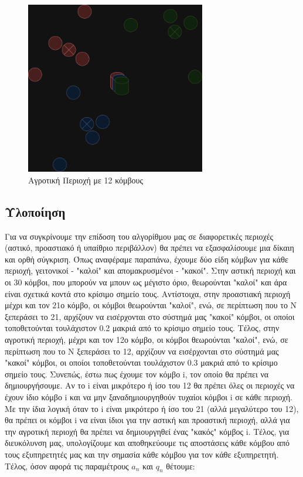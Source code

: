 \begin{figure}[H]
    \centering
    \includegraphics[width=0.7\textwidth]{figures/chapter1/rural.drawio.png}
    \caption{Αγροτική Περιοχή με 12 κόμβους}
    \label{fig49}
\end{figure}

\subsection{Υλοποίηση}

Για να συγκρίνουμε την επίδοση του αλγορίθμου μας σε διαφορετικές περιοχές (αστικό, προαστιακό ή υπαίθριο περιβάλλον) θα πρέπει να εξασφαλίσουμε μια δίκαιη και ορθή σύγκριση. Όπως αναφέραμε παραπάνω, έχουμε δύο είδη κόμβων για κάθε περιοχή, γειτονικοί - "καλοί" και απομακρυσμένοι - "κακοί". Στην αστική περιοχή και οι 30 κόμβοι, που μπορούν να μπουν ως μέγιστο όριο, θεωρούνται "καλοί" και άρα είναι σχετικά κοντά στο κρίσιμο σημείο τους. Αντίστοιχα, στην προαστιακή περιοχή μέχρι και τον 21ο κόμβο, οι κόμβοι θεωρούνται "καλοί", ενώ, σε περίπτωση που το Ν ξεπεράσει το 21, αρχίζουν να εισέρχονται στο σύστημά μας "κακοί" κόμβοι, οι οποίοι τοποθετούνται τουλάχιστον 0.2 μακριά από το κρίσιμο σημείο τους. Τέλος, στην αγροτική περιοχή, μέχρι και τον 12ο κόμβο, οι κόμβοι θεωρούνται "καλοί", ενώ, σε περίπτωση που το Ν ξεπεράσει το 12, αρχίζουν να εισέρχονται στο σύστημά μας "κακοί" κόμβοι, οι οποίοι τοποθετούνται τουλάχιστον 0.3 μακριά από το κρίσιμο σημείο τους. Συνεπώς, έστω πως έχουμε τον κόμβο i, τον οποίο θα πρέπει να δημιουργήσουμε. Αν το i είναι μικρότερο ή ίσο του 12 θα πρέπει όλες οι περιοχές να έχουν ίδιο κόμβο i και να μην ξαναδημιουργηθούν τυχαίοι κόμβοι i σε κάθε περιοχή. Με την ίδια λογική όταν το i είναι μικρότερο ή ίσο του 21 (αλλά μεγαλύτερο του 12), θα πρέπει οι κόμβοι i να είναι ίδιοι για την αστική και προαστική περιοχή, αλλά για την αγροτική περιοχή θα πρέπει να δημιουργηθεί ένας "κακός" κόμβος i. Τέλος, για διευκόλυνση μας, υπολογίζουμε και αποθηκεύουμε τις αποστάσεις κάθε κόμβου από τους εξυπηρετητές μας και την σημασία κάθε κόμβου για τον κάθε εξυπηρετητή. Τέλος, όσον αφορά τις παραμέτρους $a_n$ και $q_n$ θέτουμε:

